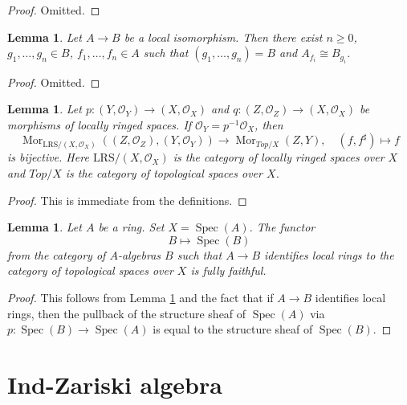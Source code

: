 \documentclass{stacks-project}
\theoremstyle{plain}
\newtheorem{lemma}[subsection]{Lemma}
\theoremstyle{definition}
\theoremstyle{remark}
\numberwithin{equation}{subsection}
\def\Spec{\mathop{\mathrm{Spec}}}
\def\Mor{\mathop{\mathrm{Mor}}\nolimits}
\begin{document}
\begin{proof}
Omitted.
\end{proof}

\begin{lemma}
\label{lemma-structure-local-isomorphism}
Let $A \to B$ be a local isomorphism. Then there exist $n \geq 0$,
$g_1, \ldots, g_n \in B$, $f_1, \ldots, f_n \in A$ such that
$(g_1, \ldots, g_n) = B$ and $A_{f_i} \cong B_{g_i}$.
\end{lemma}

\begin{proof}
Omitted.
\end{proof}

\begin{lemma}
\label{lemma-fully-faithful-spaces-over-X}
Let $p : (Y, \mathcal{O}_Y) \to (X, \mathcal{O}_X)$ and
$q : (Z, \mathcal{O}_Z) \to (X, \mathcal{O}_X)$
be morphisms of locally ringed spaces.
If $\mathcal{O}_Y = p^{-1}\mathcal{O}_X$, then
$$
\Mor_{\text{LRS}/(X, \mathcal{O}_X)}((Z, \mathcal{O}_Z), (Y, \mathcal{O}_Y))
\longrightarrow
\Mor_{\textit{Top}/X}(Z, Y),\quad
(f, f^\sharp) \longmapsto f
$$
is bijective. Here $\text{LRS}/(X, \mathcal{O}_X)$ is the category of
locally ringed spaces over $X$ and $\textit{Top}/X$ is the category
of topological spaces over $X$.
\end{lemma}

\begin{proof}
This is immediate from the definitions.
\end{proof}

\begin{lemma}
\label{lemma-local-isomorphism-fully-faithful}
Let $A$ be a ring. Set $X = \Spec(A)$. The functor
$$
B \longmapsto \Spec(B)
$$
from the category of $A$-algebras $B$ such that $A \to B$ identifies
local rings to the category of
topological spaces over $X$ is fully faithful.
\end{lemma}

\begin{proof}
This follows from Lemma \ref{lemma-fully-faithful-spaces-over-X}
and the fact that if $A \to B$ identifies local rings, then the pullback
of the structure sheaf of $\Spec(A)$ via $p : \Spec(B) \to \Spec(A)$
is equal to the structure sheaf of $\Spec(B)$.
\end{proof}




\section{Ind-Zariski algebra}
\label{section-ind-zariski}
\end{document}
